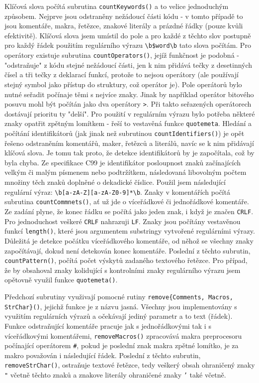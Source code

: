 \documentclass[a4paper, 10pt]{article}[12.03.2013]
\begin{document}
Klíčová slova počítá subrutina \texttt{countKeywords()} a to velice jednoduchým
způsobem. Nejprve jsou odstraněny nežádoucí části kódu - v tomto případě to jsou
komentáře, makra, řetězce, znakové literály a prázdné řádky (pouze kvůli efektivitě).
Klíčová slova jsem umístil do pole a pro každé z těchto slov postupně pro každý řádek
použitím regulárního výrazu \texttt{\textbackslash b\$word\textbackslash b} tato
slova počítám. Pro operátory existuje subrutina \texttt{countOperators()}, jejíž
funkčnost je podobná - "odstraňuje" z kódu stejné nežádoucí části, jen k nim přidává
tečky z desetinných čísel a tři tečky z deklarací funkcí, protože to nejsou operátory
(ale používají stejný symbol jako přístup do struktury, což operátor je). Pole
operátorů bylo nutné seřadit počínaje těmi s nejvíce znaky. Jinak by například
operátor bitového posuvu mohl být počítán jako dva operátory \texttt{>}. Při takto
seřazených operátorech dostávají prioritu ty "delší". Pro použití v regulárním
výrazu bylo potřeba některé znaky opatřit zpětným lomítkem - řeší to vestavěná funkce
\texttt{quotemeta}. Hledání a počítání identifikátorů (jak jinak než subrutinou
\texttt{countIdentifiers()}) je opět řešeno odstraněním komentářů, maker, řetězců
a literálů, navíc se k nim přidávají klíčová slova. Je tomu tak proto, že detekce
identifikátorů by je započítala, což by byla chyba. Ze specifikace C99 je identifikátor
posloupnost znaků začínajících velkým či malým písmenem nebo podtržítkem, následovaná
libovolným počtem množiny těch znaků doplněné o dekadické číslice. Použil jsem
následující regulární výraz:
\texttt{\textbackslash b[\textunderscore a-zA-Z][\textunderscore a-zA-Z0-9]*\textbackslash b}.
Znaky v komentářích počítá subrutina \texttt{countCommnets()}, ať už jde o víceřádkové
či jednořádkové komentáře. Ze zadání plyne, že konec řádku se počítá jako jeden znak, 
i když je značen \texttt{CRLF}. Pro jednoduchost veškeré \texttt{CRLF} nahrazuji
\texttt{LF}. Znaky jsou počítány vestavěnou funkcí \texttt{length()}, které jsou
argumentem substringy vytvořené regulárními výrazy. Důležitá je detekce počátku
víceřádkového komentáře, od něhož se všechny znaky započítávají, dokud není detekován
konec komentáře. Poslední z těchto subrutin, \texttt{countPattern()}, počítá počet
výskytů zadaného textového řetězce. Pro případ, že by obsahoval znaky kolidující s
kontrolními znaky regulárního výrazu jsem opětovně využil funkce \texttt{quotemeta()}.

Předchozí subrutiny využivají pomocné rutiny \texttt{remove\{Comments, Macros, StrChar\}()},
jejichž funkce je z názvu jasná. Všechny jsou implementovány s využitím regulárních výrazů a 
očekávají jediný parametr a to text (řádek). Funkce odstraňující komentáře pracuje jak
s jednořádkovými tak i s víceřádkovými komentářemi, \texttt{removeMacros()} zpracovává
makra preprocesoru počínající operátorem \texttt{\#}, pokud je poslední znak makra zpětné
lomítko, je za makro považován i následující řádek. Poslední z těchto subrutin, 
\texttt{removeStrChar()}, ostraňuje textové řetězce, tedy veškerý obsah ohraničený
znaky \texttt{"} včetně těchto znaků a znakove literály ohraničené znaky \texttt{'}
také včetně.
\end{document}
